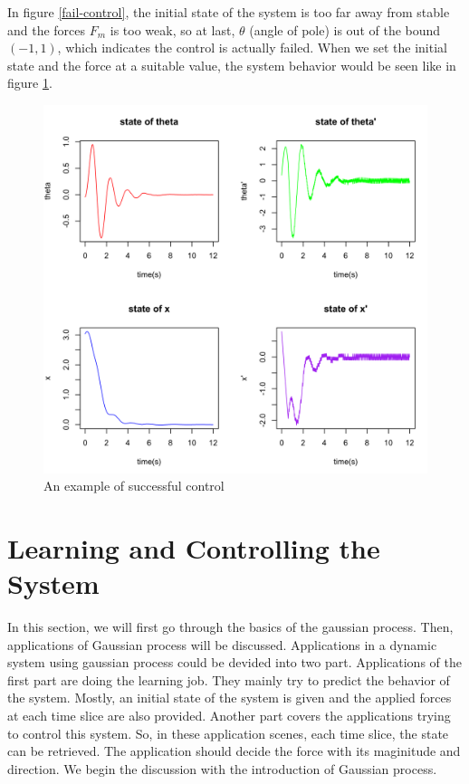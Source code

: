 \documentclass[11pt,twoside,a4paper]{article}
\begin{document}
In figure \ref{fail-control}, the initial state of the system is too
far away from stable and the forces $F_m$ is too weak, so at last,
$\theta$ (angle of pole) is out of the bound $(-1, 1)$, which indicates
the control is actually failed. When we set the initial state and the
force at a suitable value, the system behavior would be seen like in
figure \ref{success-control}.\\

\begin{figure}[!]
\begin{center}
\includegraphics[width=14cm]{success-control.png}
\caption{An example of successful control}
\label{success-control}
\end{center}
\end{figure}

\section{Learning and Controlling the System}
In this section, we will first go through the basics of the gaussian
process. Then, applications of Gaussian process will be discussed.
Applications in a dynamic system using gaussian process could be
devided into two part. Applications of the first part are doing the
learning job. They mainly try to predict the behavior of the
system. Mostly, an initial state of the system is given and the
applied forces at each time slice are also provided. Another part
covers the applications trying to control this system. So, in these
application scenes, each time slice, the state can be retrieved. The
application should decide the force with its maginitude and
direction. We begin the discussion with the introduction of Gaussian process.\\
\end{document}
